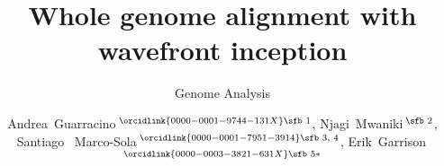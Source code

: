 \documentclass{bioinfo}
\theoremstyle{definition}
\begin{document}

\subtitle{Genome Analysis}

\title[Wavefront inception]{Whole genome alignment with wavefront inception}
\author[Guarracino \textit{et~al}.]{
Andrea~Guarracino\,$^{\orcidlink{0000-0001-9744-131X}\text{\sfb 1}}$,
Njagi~Mwaniki\,$^{\text{\sfb 2}}$,
Santiago~ Marco-Sola\,$^{\orcidlink{0000-0001-7951-3914}\text{\sfb 3, 4}}$,
Erik~Garrison\,$^{\orcidlink{0000-0003-3821-631X}\text{\sfb 5}*}$
}

\address{
$^{\text{\sf 1}}$Genomics Research Centre, Human Technopole, Viale Rita Levi‑Montalcini 1, Milan, 20157, Italy \\
$^{\text{\sf 2}}$Department of Computer Sciences, University of Pisa, Pisa, 56127, Italy \\
$^{\text{\sf 3}}$Department of Computer Sciences, Barcelona Supercomputing Center, Barcelona, 08034, Spain \\
$^{\text{\sf 4}}$Department d’Arquitectura de Computadors i Sistemes Operatius, Universitat Autònoma de Barcelona, Barcelona, 08193, Spain \\
$^{\text{\sf 5}}$Department of Genetics, Genomics and Informatics, University of Tennessee Health Science Center, Memphis, 38163, Tennessee, USA
}




\end{document}
